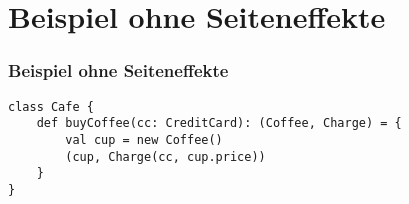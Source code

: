 	\section[Section]{Beispiel ohne Seiteneffekte}
		\begin{frame}[fragile]
		\frametitle{Beispiel ohne Seiteneffekte}
		\begin{lstlisting}[style=myScalastyle]
class Cafe {
	def buyCoffee(cc: CreditCard): (Coffee, Charge) = {
		val cup = new Coffee()
		(cup, Charge(cc, cup.price))
	}
}
\end{lstlisting}
\end{frame}